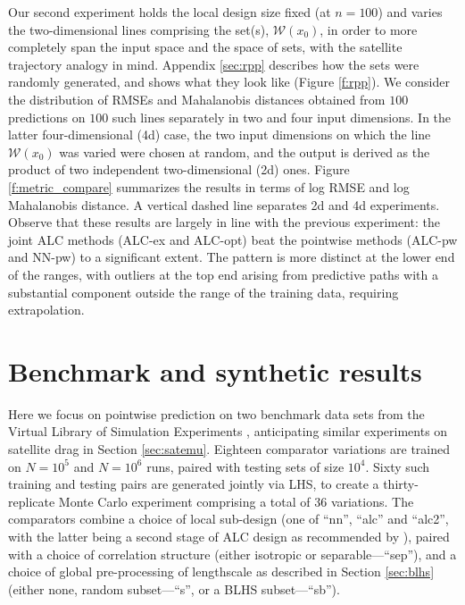 \documentclass[12pt]{article}
\begin{document}
Our second experiment holds the local design size fixed (at $n=100$) and
varies the two-dimensional lines comprising the set(s), $\mathcal{W}(x_0)$,
in order to more completely span the input space and the space of sets, with
the satellite trajectory analogy in mind.  Appendix \ref{sec:rpp} describes
how the sets were randomly generated, and shows what they look like (Figure
\ref{f:rpp}).  We consider the distribution of RMSEs and Mahalanobis distances
obtained from $100$ predictions on $100$ such lines separately in two and four
input dimensions.  In the latter four-dimensional (4d) case, the two input dimensions on which
the line $\mathcal{W}(x_0)$ was varied were chosen at random, and the output
is derived as the product of two independent two-dimensional (2d) ones.  Figure
\ref{f:metric_compare} summarizes the results in terms of log RMSE and
log Mahalanobis distance. A vertical dashed line separates 2d and 4d experiments.
Observe that these results are largely in line with the previous experiment:
the joint ALC methods (ALC-ex and ALC-opt) beat the pointwise methods (ALC-pw
and NN-pw) to a significant extent.  The pattern is more distinct at the lower
end of the ranges, with outliers at the top end arising from predictive paths
with a substantial component outside the range of the training data, requiring
extrapolation. %

\section{Benchmark and synthetic results}
\label{sec:bench}

Here we focus on pointwise prediction on two benchmark data sets from the
Virtual Library of Simulation Experiments \citep{simulationlib}, anticipating
similar experiments on satellite drag in Section \ref{sec:satemu}.  Eighteen
comparator variations are trained on $N=10^5$ and $N=10^6$ runs, paired with
testing sets of size $10^4$. Sixty such training and testing pairs are
generated jointly via LHS, to create a thirty-replicate Monte Carlo experiment
comprising a total of 36 variations. The comparators combine a choice of local
sub-design (one of ``nn'', ``alc'' and ``alc2'', with the latter being a
second stage of ALC design as recommended by \citet{gramacy:apley:2015}),
paired with a choice of correlation structure (either isotropic or
separable---``sep''), and a choice of global pre-processing of lengthscale as
described in Section \ref{sec:blhs} (either none, random subset---``s'', or a
BLHS subset---``sb'').
\end{document}
